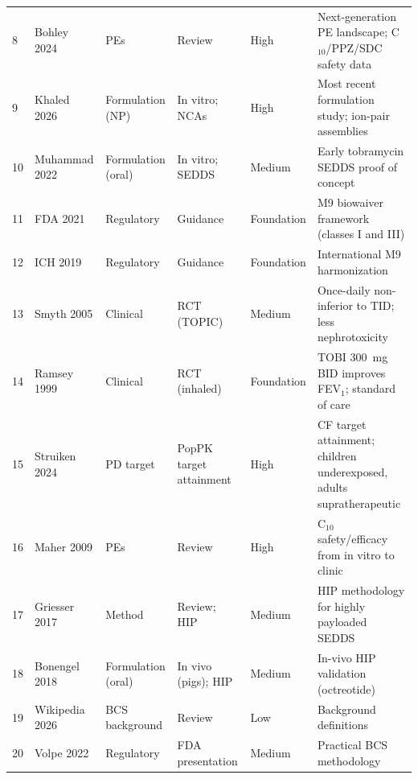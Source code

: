 \begin{landscape}
\begin{longtable}{p{0.9cm}p{1.7cm}p{2.0cm}p{3.6cm}p{2.2cm}p{6.8cm}}
8 & Bohley 2024 \citep{Bohley2024} & PEs & Review & High & Next-generation PE landscape; C$_{10}$/PPZ/SDC safety data\\
9 & Khaled 2026 \citep{Khaled2026} & Formulation (NP) & In vitro; NCAs & High & Most recent formulation study; ion-pair assemblies\\
10 & Muhammad 2022 \citep{Muhammad2022} & Formulation (oral) & In vitro; SEDDS & Medium & Early tobramycin SEDDS proof of concept\\
11 & FDA 2021 \citep{FDA2021} & Regulatory & Guidance & Foundation & M9 biowaiver framework (classes I and III)\\
12 & ICH 2019 \citep{ICH2019} & Regulatory & Guidance & Foundation & International M9 harmonization\\
13 & Smyth 2005 \citep{Smyth2005} & Clinical & RCT (TOPIC) & Medium & Once-daily non-inferior to TID; less nephrotoxicity\\
14 & Ramsey 1999 \citep{Ramsey1999} & Clinical & RCT (inhaled) & Foundation & TOBI 300~mg BID improves FEV$_1$; standard of care\\
15 & Struiken 2024 \citep{Struiken2024} & PD target & PopPK target attainment & High & CF target attainment; children underexposed, adults supratherapeutic\\
16 & Maher 2009 \citep{Maher2009} & PEs & Review & High & C$_{10}$ safety/efficacy from in vitro to clinic\\
17 & Griesser 2017 \citep{Griesser2017} & Method & Review; HIP & Medium & HIP methodology for highly payloaded SEDDS\\
18 & Bonengel 2018 \citep{Bonengel2018} & Formulation (oral) & In vivo (pigs); HIP & Medium & In-vivo HIP validation (octreotide)\\
19 & Wikipedia 2026 & BCS background & Review & Low & Background definitions\\
20 & Volpe 2022 \citep{Volpe2022} & Regulatory & FDA presentation & Medium & Practical BCS methodology\\
\end{longtable}
\end{landscape}

